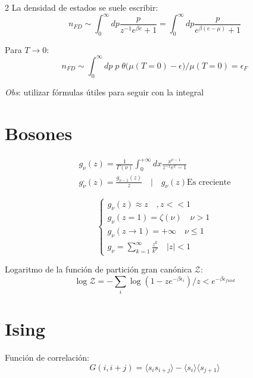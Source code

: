 \documentclass[a4, 12pt]{article}
\begin{document}
\begin{multicols}{2}
    La densidad de estados se suele escribir:
    \begin{equation*}
      n_{FD} \sim \int_{0}^{\infty}dp \frac{p}{z^{-1}e^{\beta e} + 1} = \int_{0}^{\infty}dp \frac{p}{e^{\beta (e - \mu)} + 1}
    \end{equation*}

    Para $T \rightarrow 0$:
    \begin{equation*}
      n_{FD} \sim \int_{0}^{\infty} dp \;p\; \theta\bigg(\mu(T=0) - \epsilon\bigg) \big/ \mu(T=0)=\epsilon_F
    \end{equation*}

    \textit{Obs}: utilizar fórmulas útiles para seguir con la integral

    \section*{Bosones}
    \begin{equation*}
      \begin{aligned}
        g_{\nu}(z) = \frac{1}{\Gamma(\nu)} \int_{0}^{+\infty} dx \frac{x^{\nu - 1}}{z^{-1}e^{x} - 1} \\
        g_{\nu}^{,}(z) = \frac{g_{\nu - 1}(z)}{z} \quad | \quad g_{\nu}(z) \text{Es creciente}
      \end{aligned}
    \end{equation*}

    \begin{equation*}
      \begin{cases}
        g_{\nu}(z) \approx z \quad,z <<1\\
        g_{\nu}(z=1) = \zeta(\nu) \quad \nu > 1 \\
        g_{\nu}(z\rightarrow 1) = +\infty  \quad \nu \leq 1 \\
        g_{\nu} = \sum_{k=1}^{\infty}\frac{z^k}{k^{\nu}} \quad |z|<1
      \end{cases}
    \end{equation*}

    Logaritmo de la función de partición gran canónica $\mathcal{Z}$:
    \begin{equation*}
      \log{\mathcal{Z}} = -\sum_i \log(1 - z e^{-\beta \epsilon_i}) \big/ z < e^{-\beta \epsilon_{fund}}
    \end{equation*}

    \section*{Ising}
    Función de correlación:
    \begin{equation*}
      G(i, i + j) = \langle s_i s_{i+j} \rangle - \langle s_i \rangle\langle s_{j+1}\rangle
    \end{equation*}


\end{multicols}
\end{document}
